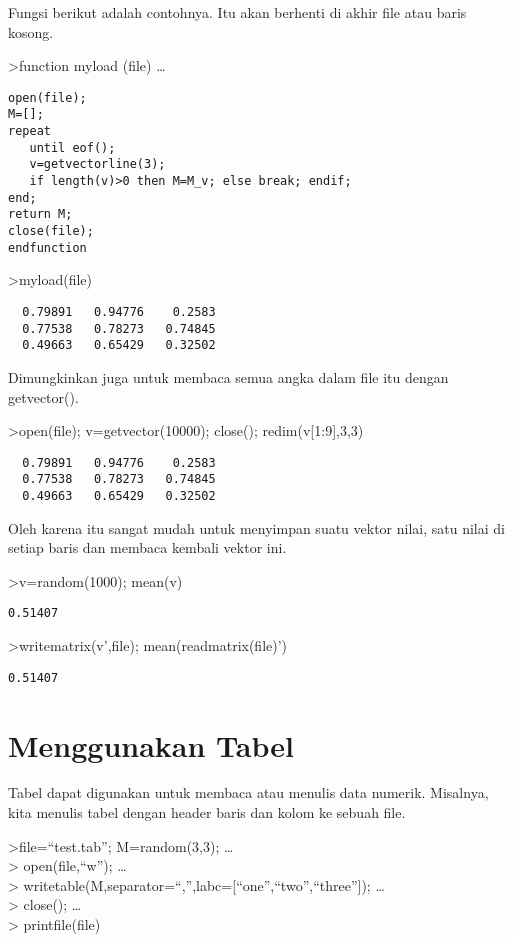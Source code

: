 \documentclass[
]{book}
\begin{document}
Fungsi berikut adalah contohnya. Itu akan berhenti di akhir file atau baris kosong.

\textgreater function myload (file) \ldots{}

\begin{verbatim}
open(file);
M=[];
repeat
   until eof();
   v=getvectorline(3);
   if length(v)>0 then M=M_v; else break; endif;
end;
return M;
close(file);
endfunction
\end{verbatim}

\textgreater myload(file)

\begin{verbatim}
  0.79891   0.94776    0.2583 
  0.77538   0.78273   0.74845 
  0.49663   0.65429   0.32502 
\end{verbatim}

Dimungkinkan juga untuk membaca semua angka dalam file itu dengan getvector().

\textgreater open(file); v=getvector(10000); close(); redim(v{[}1:9{]},3,3)

\begin{verbatim}
  0.79891   0.94776    0.2583 
  0.77538   0.78273   0.74845 
  0.49663   0.65429   0.32502 
\end{verbatim}

Oleh karena itu sangat mudah untuk menyimpan suatu vektor nilai, satu nilai di setiap baris dan membaca kembali vektor ini.

\textgreater v=random(1000); mean(v)

\begin{verbatim}
0.51407
\end{verbatim}

\textgreater writematrix(v',file); mean(readmatrix(file)')

\begin{verbatim}
0.51407
\end{verbatim}

\chapter{Menggunakan Tabel}\label{menggunakan-tabel}

Tabel dapat digunakan untuk membaca atau menulis data numerik. Misalnya, kita menulis tabel dengan header baris dan kolom ke sebuah file.

\textgreater file=``test.tab''; M=random(3,3); \ldots{}\\
\textgreater{} open(file,``w''); \ldots{}\\
\textgreater{} writetable(M,separator=``,'',labc={[}``one'',``two'',``three''{]}); \ldots{}\\
\textgreater{} close(); \ldots{}\\
\textgreater{} printfile(file)
\end{document}
